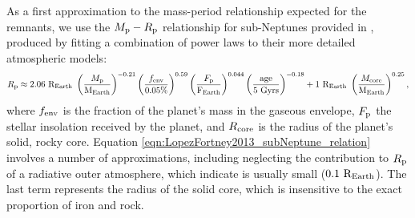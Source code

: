 \documentclass[smallcondensed]{svjour3}    %
\begin{document}
As a first approximation to the mass-period relationship expected for the remnants, we use the $M_{\rm p}-R_{\rm p}$ relationship for sub-Neptunes provided in \cite{}, produced by fitting a combination of power laws to their more detailed atmospheric models:
\begin{equation}
R_{\rm p} \approx 2.06\ {\rm R_{Earth}}\ \left( \dfrac{M_{\rm p}}{\rm M_{Earth}} \right)^{-0.21} \left( \dfrac{f_{\rm env}}{0.05\%} \right)^{0.59} \left( \dfrac{F_{\rm p}}{\rm F_{Earth}} \right)^{0.044} \left( \dfrac{\rm age}{\rm 5\ Gyrs} \right)^{-0.18} + 1\ {\rm R_{Earth}}\  \left( \dfrac{M_{\rm core}}{\rm M_{Earth}} \right)^{0.25},
\label{eqn:LopezFortney2013_subNeptune_relation}
\end{equation}
where $f_{\rm env}$ is the fraction of the planet's mass in the gaseous envelope, $F_{\rm p}$ the stellar insolation received by the planet, and $R_{\rm core}$ is the radius of the planet's solid, rocky core. Equation \ref{eqn:LopezFortney2013_subNeptune_relation} involves a number of approximations, including neglecting the contribution to $R_{\rm p}$ of a radiative outer atmosphere, which \cite{} indicate is usually small ($0.1\ {\rm R_{Earth}}$).  The last term represents the radius of the solid core, which is insensitive to the exact proportion of iron and rock.




\end{document}
